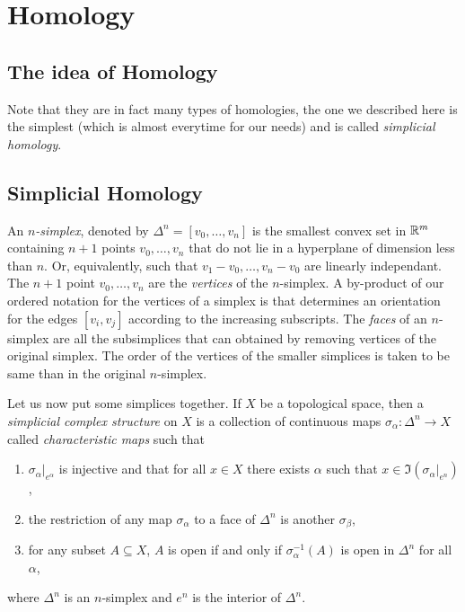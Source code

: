 \section{Homology}

    \subsection{The idea of Homology}

        

        Note that they are in fact many types of homologies, the one we described here is the simplest (which is almost everytime for our needs) and is called \emph{simplicial homology}.

    \subsection{Simplicial Homology}

        An \emph{$n$-simplex}, denoted by $\Delta^n=[v_0,\dots,v_n]$ is the smallest convex set in $\mathbb{R}^m$ containing $n+1$ points $v_0,\dots,v_n$ that do not lie in a hyperplane of dimension less than $n$. Or, equivalently, such that $v_1-v_0,\dots,v_n-v_0$ are linearly independant. The $n+1$ point $v_0,\dots,v_n$ are the \emph{vertices} of the $n$-simplex. A by-product of our ordered notation for the vertices of a simplex is that determines an orientation for the edges $[v_i,v_j]$ according to the increasing subscripts. The \emph{faces} of an $n$-simplex are all the subsimplices that can obtained by removing vertices of the original simplex. The order of the vertices of the smaller simplices is taken to be same than in the original $n$-simplex. 
        
        Let us now put some simplices together. If $X$ be a topological space, then a \emph{simplicial complex structure} on $X$ is a collection of continuous maps $\sigma_\alpha:\Delta^n\to X$ called \emph{characteristic maps} such that
        \begin{enumerate}[label=\roman*)]
            \item $\sigma_\alpha|_{e^\alpha}$ is injective and that for all $x\in X$ there exists $\alpha$ such that $x\in\Im(\sigma_\alpha|_{e^n})$,
            \item the restriction of any map $\sigma_\alpha$ to a face of $\Delta^n$ is another $\sigma_\beta$,
            \item for any subset $A\subseteq X$, $A$ is open if and only if $\sigma^{-1}_{\alpha}(A)$ is open in $\Delta^n$ for all $\alpha$,
        \end{enumerate}
        where $\Delta^n$ is an $n$-simplex and $e^n$ is the interior of $\Delta^n$. 

